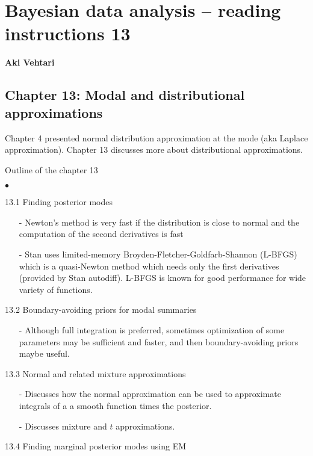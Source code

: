 \documentclass[a4paper,11pt,english]{article}
\begin{document}
\thispagestyle{empty}

\section*{Bayesian data analysis -- reading instructions 13} 
\smallskip
{\bf Aki Vehtari}
\smallskip

\subsection*{Chapter 13: Modal and distributional approximations}

Chapter 4 presented normal distribution approximation at the mode (aka
Laplace approximation). Chapter 13 discusses more about distributional
approximations.

Outline of the chapter 13
\begin{list}{$\bullet$}{\parsep=0pt\itemsep=2pt}
\item[13.1] Finding posterior modes
  \begin{itemize}
  \item[-] Newton's method is very fast if the distribution is close to
    normal and the computation of the second derivatives is fast
  \item[-] Stan uses limited-memory Broyden-Fletcher-Goldfarb-Shannon
    (L-BFGS) which is a quasi-Newton method which needs only the first
    derivatives (provided by Stan autodiff). L-BFGS is known for good
    performance for wide variety of functions.
  \end{itemize}
\item[13.2] Boundary-avoiding priors for modal summaries
  \begin{itemize}
  \item[-] Although full integration is preferred, sometimes optimization
    of some parameters may be sufficient and faster, and then
    boundary-avoiding priors maybe useful.
  \end{itemize}
\item[13.3] Normal and related mixture approximations
  \begin{itemize}
  \item[-] Discusses how the normal approximation can be used to
    approximate integrals of a a smooth function times the posterior.
  \item[-] Discusses mixture and $t$ approximations.
  \end{itemize}
\item[13.4] Finding marginal posterior modes using EM

\end{list}
\end{document}
